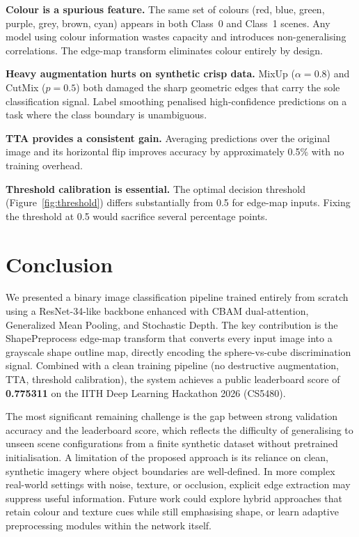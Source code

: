 \documentclass{article}
\theoremstyle{plain}
\theoremstyle{definition}
\theoremstyle{remark}
\begin{document}
\textbf{Colour is a spurious feature.}
The same set of colours (red, blue, green, purple, grey, brown, cyan)
appears in both Class~0 and Class~1 scenes.  Any model using colour
information wastes capacity and introduces non-generalising correlations.
The edge-map transform eliminates colour entirely by design.

\textbf{Heavy augmentation hurts on synthetic crisp data.}
MixUp ($\alpha = 0.8$) and CutMix ($p = 0.5$) both damaged the
sharp geometric edges that carry the sole classification signal.
Label smoothing penalised high-confidence predictions on a task where
the class boundary is unambiguous.

\textbf{TTA provides a consistent gain.}
Averaging predictions over the original image and its horizontal flip
improves accuracy by approximately 0.5\% with no training overhead.

\textbf{Threshold calibration is essential.}
The optimal decision threshold (Figure~\ref{fig:threshold}) differs
substantially from 0.5 for edge-map inputs.  Fixing the threshold
at 0.5 would sacrifice several percentage points.

\section{Conclusion}
\label{sec:conclusion}

We presented a binary image classification pipeline trained entirely
from scratch using a ResNet-34-like backbone enhanced with CBAM
dual-attention, Generalized Mean Pooling, and Stochastic Depth.  The
key contribution is the ShapePreprocess edge-map transform
that converts every input image into a grayscale shape outline map,
directly encoding the sphere-vs-cube discrimination signal.  Combined
with a clean training pipeline (no destructive augmentation, TTA,
threshold calibration), the system achieves a public leaderboard score
of \textbf{0.775311} on the IITH Deep Learning Hackathon 2026 (CS5480).

The most significant remaining challenge is the gap between strong
validation accuracy and the leaderboard score, which reflects the
difficulty of generalising to unseen scene configurations from a
finite synthetic dataset without pretrained initialisation. A limitation of the proposed approach is its reliance on clean,
synthetic imagery where object boundaries are well-defined. In more
complex real-world settings with noise, texture, or occlusion, explicit
edge extraction may suppress useful information. Future work could
explore hybrid approaches that retain colour and texture cues while
still emphasising shape, or learn adaptive preprocessing modules within
the network itself.
\end{document}
